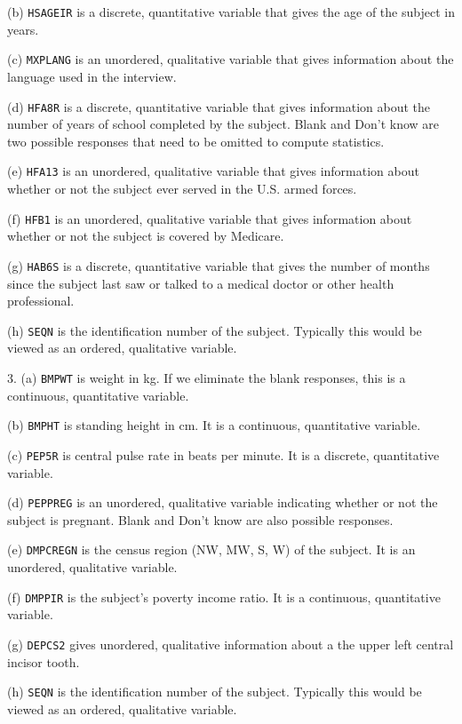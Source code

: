\documentclass[10pt]{article}
\begin{document}
(b) \texttt{HSAGEIR} is a discrete, quantitative variable that gives the age
of the subject in years.

(c) \texttt{MXPLANG} is an unordered, qualitative variable that gives information
about the language used in the interview.

(d) \texttt{HFA8R} is a discrete, quantitative variable that gives information
about the number of years of school completed by the subject.  Blank and Don't know
are two possible responses that need to be omitted to compute statistics.

(e) \texttt{HFA13} is an unordered, qualitative variable that gives information
about whether or not the subject ever served in the U.S. armed forces.

(f) \texttt{HFB1}  is an unordered, qualitative variable that gives information
about whether or not the subject is covered by Medicare.

(g) \texttt{HAB6S}  is a discrete, quantitative variable that gives the number
of months since the subject last saw or talked to a medical doctor or other 
health professional.

(h) \texttt{SEQN} is the identification number of the subject.  Typically this would
be viewed as an ordered, qualitative variable.
\medskip


3. (a) \texttt{BMPWT} is weight in kg.  If we eliminate the blank responses, this is a 
continuous, quantitative variable.  

(b) \texttt{BMPHT} is standing height in cm.  
It is a  continuous, quantitative variable. 

(c) \texttt{PEP5R} is central pulse rate
in beats per minute.  It is a discrete, quantitative variable.

(d) \texttt{PEPPREG} is an unordered, qualitative variable indicating 
whether or not the subject is pregnant.  Blank and Don't know are also possible responses.

(e) \texttt{DMPCREGN}  is the census region (NW, MW, S, W) of the subject.  It is 
   an unordered, qualitative variable.

(f) \texttt{DMPPIR}  is the subject's poverty income ratio.  It is a continuous,
  quantitative variable.

(g) \texttt{DEPCS2}  gives unordered, qualitative  information about a the upper left
central incisor tooth.  

(h) \texttt{SEQN} is the identification number of the subject.  Typically this would
be viewed as an ordered, qualitative variable.
\medskip
\end{document}
